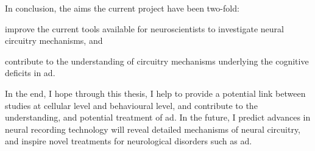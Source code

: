 In conclusion, the aims the current project have been two-fold: 
\begin{enumerate*}[label={\alph*)}, font={\bfseries}]
    \item improve the current tools available for neuroscientists to investigate neural circuitry mechanisms, and
    \item contribute to the understanding of circuitry mechanisms underlying the cognitive deficits in \gls{ad}.
\end{enumerate*}
In the end, I hope through this thesis, I help to provide a potential link between studies at cellular level and behavioural level, and contribute to the understanding, and potential treatment of \gls{ad}. In the future, I predict advances in neural recording technology will reveal detailed mechanisms of neural circuitry, and inspire novel treatments for neurological disorders such as \gls{ad}. 
